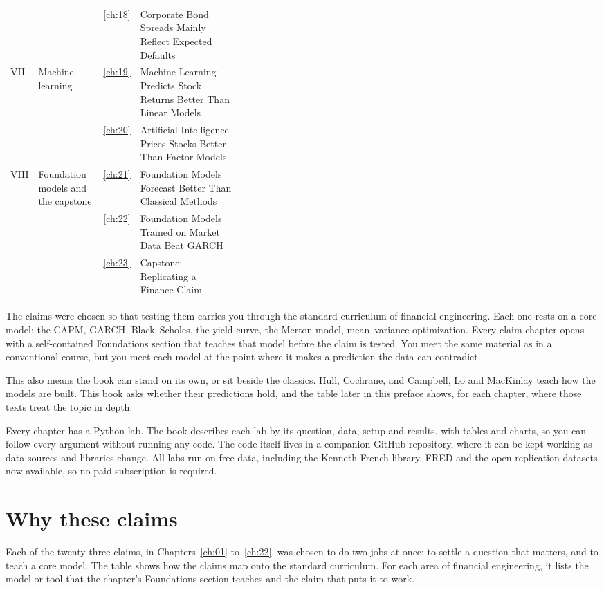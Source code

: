 \begin{table}[htbp]
\begin{tabularx}{0.95\linewidth}{@{}>{\raggedright\arraybackslash}p{0.07\linewidth}>{\raggedright\arraybackslash}p{0.28\linewidth}>{\raggedleft\arraybackslash}p{0.04\linewidth}>{\raggedright\arraybackslash}X@{}}
 &  & \ref{ch:18} & Corporate Bond Spreads Mainly Reflect Expected Defaults \\
\addlinespace
VII & Machine learning & \ref{ch:19} & Machine Learning Predicts Stock Returns Better Than Linear Models \\
 &  & \ref{ch:20} & Artificial Intelligence Prices Stocks Better Than Factor Models \\
\addlinespace
VIII & Foundation models and the capstone & \ref{ch:21} & Foundation Models Forecast Better Than Classical Methods \\
 &  & \ref{ch:22} & Foundation Models Trained on Market Data Beat GARCH \\
 &  & \ref{ch:23} & Capstone: Replicating a Finance Claim \\
\bottomrule
\end{tabularx}
\end{table}


The claims were chosen so that testing them carries you through the standard curriculum of financial engineering. Each one rests on a core model: the CAPM, GARCH, Black--Scholes, the yield curve, the Merton model, mean--variance optimization. Every claim chapter opens with a self-contained Foundations section that teaches that model before the claim is tested. You meet the same material as in a conventional course, but you meet each model at the point where it makes a prediction the data can contradict.

This also means the book can stand on its own, or sit beside the classics. Hull, Cochrane, and Campbell, Lo and MacKinlay teach how the models are built. This book asks whether their predictions hold, and the table later in this preface shows, for each chapter, where those texts treat the topic in depth.

Every chapter has a Python lab. The book describes each lab by its question, data, setup and results, with tables and charts, so you can follow every argument without running any code. The code itself lives in a companion GitHub repository, where it can be kept working as data sources and libraries change. All labs run on free data, including the Kenneth French library, FRED and the open replication datasets now available, so no paid subscription is required.

\section*{Why these claims}

Each of the twenty-three claims, in Chapters~\ref{ch:01} to~\ref{ch:22}, was chosen to do two jobs at once: to settle a question that matters, and to teach a core model. The table shows how the claims map onto the standard curriculum. For each area of financial engineering, it lists the model or tool that the chapter's Foundations section teaches and the claim that puts it to work.

